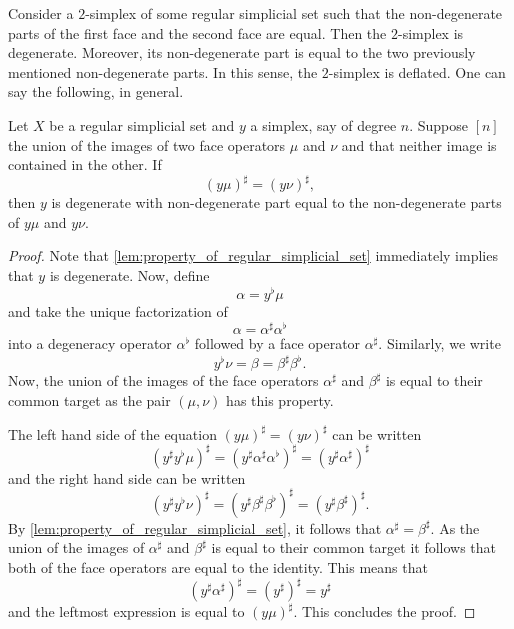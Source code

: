 Consider a $2$-simplex of some regular simplicial set such that the non-degenerate parts of the first face and the second face are equal. Then the $2$-simplex is degenerate. Moreover, its non-degenerate part is equal to the two previously mentioned non-degenerate parts. In this sense, the $2$-simplex is deflated. One can say the following, in general.
\begin{proposition}\label{prop:deflation_theorem}
Let $X$ be a regular simplicial set and $y$ a simplex, say of degree $n$. Suppose $[n]$ the union of the images of two face operators $\mu$ and $\nu$ and that neither image is contained in the other. If
\[(y\mu )^\sharp =(y\nu )^\sharp ,\]
then $y$ is degenerate with non-degenerate part equal to the non-degenerate parts of $y\mu$ and $y\nu$.
\end{proposition}
\begin{proof}
Note that \cref{lem:property_of_regular_simplicial_set} immediately implies that $y$ is degenerate. Now, define
\[\alpha =y^\flat \mu\]
and take the unique factorization of
\[\alpha =\alpha ^\sharp \alpha ^\flat\]
into a degeneracy operator $\alpha ^\flat$ followed by a face operator $\alpha ^\sharp$. Similarly, we write
\[y^\flat \nu =\beta =\beta ^\sharp \beta ^\flat .\]
Now, the union of the images of the face operators $\alpha ^\sharp$ and $\beta ^\sharp$ is equal to their common target as the pair $(\mu ,\nu )$ has this property.

The left hand side of the equation $(y\mu )^\sharp =(y\nu )^\sharp$ can be written
\[(y^\sharp y^\flat \mu )^\sharp =(y^\sharp \alpha ^\sharp \alpha ^\flat )^\sharp =(y^\sharp \alpha ^\sharp )^\sharp\]
and the right hand side can be written
\[(y^\sharp y^\flat \nu )^\sharp =(y^\sharp \beta ^\sharp \beta ^\flat )^\sharp =(y^\sharp \beta ^\sharp )^\sharp.\]
By \cref{lem:property_of_regular_simplicial_set}, it follows that $\alpha ^\sharp =\beta ^\sharp$. As the union of the images of $\alpha ^\sharp$ and $\beta ^\sharp$ is equal to their common target it follows that both of the face operators are equal to the identity. This means that
\[(y^\sharp \alpha ^\sharp )^\sharp =(y^\sharp )^\sharp =y^\sharp\]
and the leftmost expression is equal to $(y\mu )^\sharp$. This concludes the proof.
\end{proof}




